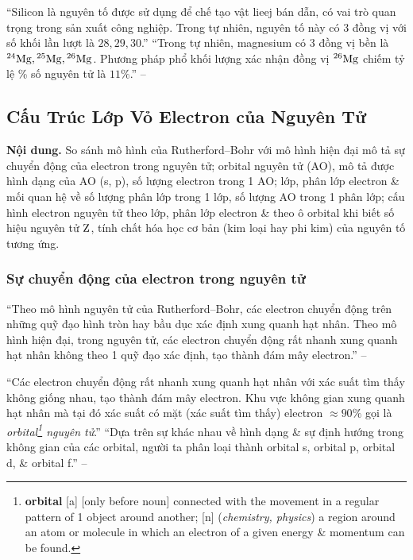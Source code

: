 \documentclass{article}
\numberwithin{equation}{section}
\begin{document}
``Silicon là nguyên tố được sử dụng để chế tạo vật lieej bán dẫn, có vai trò quan trọng trong sản xuất công nghiệp. Trong tự nhiên, nguyên tố này có 3 đồng vị với số khối lần lượt là $28,29,30$.'' ``Trong tự nhiên, magnesium có 3 đồng vị bền là $\rm{}^{24}Mg,{}^{25}Mg,{}^{26}Mg$. Phương pháp phổ khối lượng xác nhận đồng vị $\rm{}^{26}Mg$ chiếm tỷ lệ \% số nguyên tử là $11\%$.'' -- \cite[p. 25]{SGK_Hoa_Hoc_10_Chan_Troi_Sang_Tao}


\subsection{Cấu Trúc Lớp Vỏ Electron của Nguyên Tử}
\textsf{\textbf{Nội dung.} So sánh mô hình của Rutherford--Bohr với mô hình hiện đại mô tả sự chuyển động của electron trong nguyên tử; orbital nguyên tử (AO), mô tả được hình dạng của AO (s, p), số lượng electron trong 1 AO; lớp, phân lớp electron \& mối quan hệ về số lượng phân lớp trong 1 lớp, số lượng AO trong 1 phân lớp; cấu hình electron nguyên tử theo lớp, phân lớp electron \& theo ô orbital khi biết số hiệu nguyên tử $\rm Z$, tính chất hóa học cơ bản (kim loại hay phi kim) của nguyên tố tương ứng.}

\subsubsection{Sự chuyển động của electron trong nguyên tử}
``Theo mô hình nguyên tử của Rutherford--Bohr, các electron chuyển động trên những quỹ đạo hình tròn hay bầu dục xác định xung quanh hạt nhân. Theo mô hình hiện đại, trong nguyên tử, các electron chuyển động rất nhanh xung quanh hạt nhân không theo 1 quỹ đạo xác định, tạo thành đám mây electron.'' -- \cite[p. 27]{SGK_Hoa_Hoc_10_Chan_Troi_Sang_Tao}

``Các electron chuyển động rất nhanh xung quanh hạt nhân với xác suất tìm thấy không giống nhau, tạo thành đám mây electron. Khu vực không gian xung quanh hạt nhân mà tại đó xác suất có mặt (xác suất tìm thấy) electron $\approx90\%$ gọi là \textit{orbital\footnote{\textbf{orbital} [a] [only before noun] connected with the movement in a regular pattern of 1 object around another; [n] (\textit{chemistry, physics}) a region around an atom or molecule in which an electron of a given energy \& momentum can be found.} nguyên tử}.'' ``Dựa trên sự khác nhau về hình dạng \& sự định hướng trong không gian của các orbital, người ta phân loại thành orbital s, orbital p, orbital d, \& orbital f.'' -- \cite[p. 27]{SGK_Hoa_Hoc_10_Chan_Troi_Sang_Tao}
\end{document}
